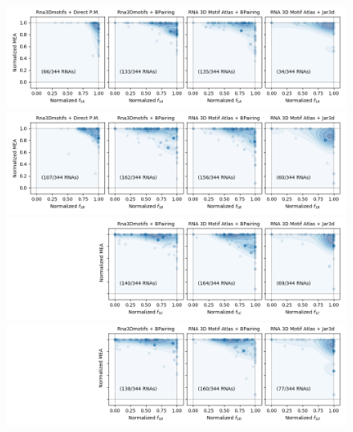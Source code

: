 \documentclass{article}
\begin{document}
\begin{figure}[h!]
\includegraphics[width=\textwidth]{kernels_A.jpg}
\includegraphics[width=\textwidth]{fig/kernels_B.png}
\includegraphics[width=\textwidth]{fig/kernels_C.png}
\includegraphics[width=\textwidth]{fig/kernels_D.png}
\end{figure}
\end{document}
